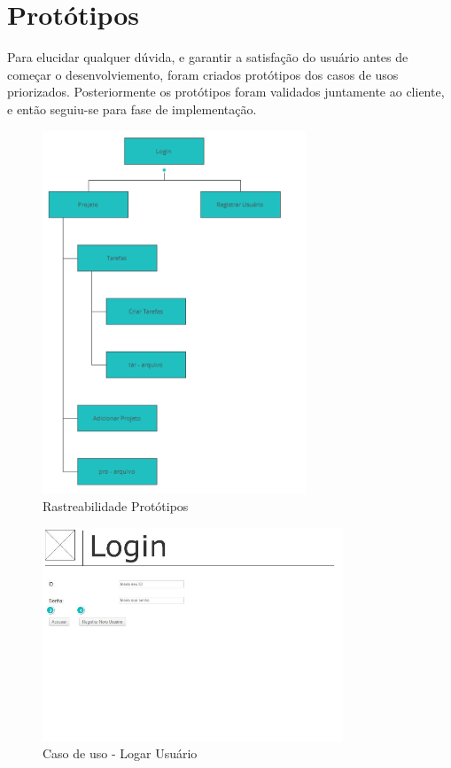 \chapter{Protótipos}

Para elucidar qualquer dúvida, e garantir a satisfação do usuário antes de começar o desenvolviemento, foram criados protótipos dos casos de usos priorizados. Posteriormente os protótipos foram validados juntamente ao cliente, e então seguiu-se para fase de implementação. 

\begin{figure}[H]
  \center
  \includegraphics[width=0.7\textwidth]{figuras/Prototipo1}
  \caption{Rastreabilidade Protótipos}
  \label{fig: Rastreabilidade-prototipos}
\end{figure}

\begin{figure}[H]
  \center
  \includegraphics[width=0.8\textwidth]{figuras/Prototipo2}
  \caption{Caso de uso - Logar Usuário}
  \label{fig:uc-logar-usuario}
\end{figure}

